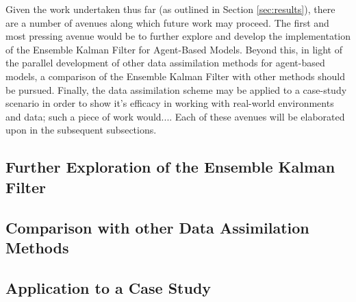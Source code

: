 Given the work undertaken thus far (as outlined in Section \ref{sec:results}),
there are a number of avenues along which future work may proceed.
The first and most pressing avenue would be to further explore and develop the
implementation of the Ensemble Kalman Filter for Agent-Based Models.
Beyond this, in light of the parallel development of other data assimilation
methods for agent-based models, a comparison of the Ensemble Kalman Filter with
other methods should be pursued.
Finally, the data assimilation scheme may be applied to a case-study scenario in
order to show it's efficacy in working with real-world environments and data;
such a piece of work would....
Each of these avenues will be elaborated upon in the subsequent subsections.

\subsection{Further Exploration of the Ensemble Kalman
Filter}\label{sub:timetable:further}

\subsection{Comparison with other Data Assimilation
Methods}\label{sub:timetable:comparison}

\subsection{Application to a Case Study}\label{sub:timetable:application}

